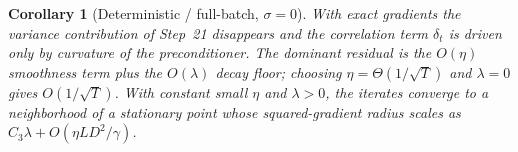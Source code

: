 \documentclass[11pt]{article}
\newtheorem{corollary}{Corollary}
\begin{document}
\begin{corollary}[Deterministic / full-batch, $\sigma=0$]
With exact gradients the variance contribution of Step~21 disappears and the
correlation term $\delta_t$ is driven only by curvature of the preconditioner. The
dominant residual is the $O(\eta)$ smoothness term plus the $O(\lambda)$ decay floor;
choosing $\eta=\Theta(1/\sqrt T)$ and $\lambda=0$ gives $O(1/\sqrt T)$. With constant
small $\eta$ and $\lambda>0$, the iterates converge to a neighborhood of a stationary
point whose squared-gradient radius scales as $C_3\lambda+O(\eta L D^2/\gamma)$.
\end{corollary}

\end{document}
